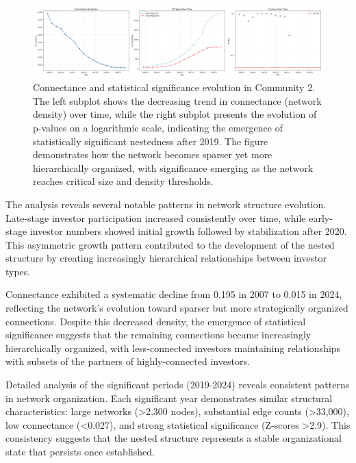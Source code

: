 \begin{figure}[htbp]
\hspace*{-1cm}\centering
\includegraphics[width=1.2\textwidth]{./assets/connectance-evolution.png}
\caption{Connectance and statistical significance evolution in Community 2. The left subplot shows the decreasing trend in connectance (network density) over time, while the right subplot presents the evolution of p-values on a logarithmic scale, indicating the emergence of statistically significant nestedness after 2019. The figure demonstrates how the network becomes sparser yet more hierarchically organized, with significance emerging as the network reaches critical size and density thresholds.}
\label{fig:connectance_evolution}
\end{figure}

The analysis reveals several notable patterns in network structure evolution. Late-stage investor participation increased consistently over time, while early-stage investor numbers showed initial growth followed by stabilization after 2020. This asymmetric growth pattern contributed to the development of the nested structure by creating increasingly hierarchical relationships between investor types.

Connectance exhibited a systematic decline from 0.195 in 2007 to 0.015 in 2024, reflecting the network's evolution toward sparser but more strategically organized connections. Despite this decreased density, the emergence of statistical significance suggests that the remaining connections became increasingly hierarchically organized, with less-connected investors maintaining relationships with subsets of the partners of highly-connected investors.

Detailed analysis of the significant periods (2019-2024) reveals consistent patterns in network organization. Each significant year demonstrates similar structural characteristics: large networks (>2,300 nodes), substantial edge counts (>33,000), low connectance (<0.027), and strong statistical significance (Z-scores >2.9). This consistency suggests that the nested structure represents a stable organizational state that persists once established.

